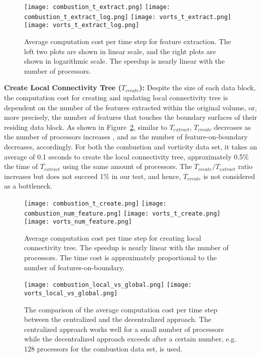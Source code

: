 \begin{figure}[t]
\centering
\texttt{[image: combustion\_t\_extract.png]}
\texttt{[image: combustion\_t\_extract\_log.png]}
\texttt{[image: vorts\_t\_extract.png]}
\texttt{[image: vorts\_t\_extract\_log.png]}
\caption{Average computation cost per time step for feature extraction. The left two plots are shown in linear scale, and the right plots are shown in logarithmic scale. The speedup is nearly linear with the number of processors.}
\label{fig:feature-extraction}
\end{figure}

\textbf{Create Local Connectivity Tree ($T_{create}$): }
Despite the size of each data block, the computation cost for creating and updating local connectivity tree is dependent on the number of the features extracted within the original volume, or, more precisely, the number of features that touches the boundary surfaces of their residing data block. As shown in Figure~\ref{fig:create-local-graph}, similar to $T_{extract}$, $T_{create}$ decreases as the number of processors increases %
, and as the number of feature-on-boundary decreases, accordingly. For both the combustion and vorticity data set, it takes an average of 0.1 seconds to create the local connectivity tree, approximately 0.5\% the time of $T_{extract}$ using the same amount of processors. The $T_{create}/T_{extract}$ ratio increases but does not succeed 1\% in our test, and hence, $T_{create}$ is not considered as a bottleneck. %

\begin{figure}[t]
\centering
\texttt{[image: combustion\_t\_create.png]}
\texttt{[image: combustion\_num\_feature.png]}
\texttt{[image: vorts\_t\_create.png]}
\texttt{[image: vorts\_num\_feature.png]}
\caption{Average computation cost per time step for creating local connectivity tree. The speedup is nearly linear with the number of processors. The time cost is approximately proportional to the number of features-on-boundary.}
\label{fig:create-local-graph}
\end{figure}

\begin{figure}[ht]
\centering
\texttt{[image: combustion\_local\_vs\_global.png]}
\texttt{[image: vorts\_local\_vs\_global.png]}
\caption{The comparison of the average computation cost per time step between the centralized and the decentralized approach. The centralized approach works well for a small number of processors while the decentralized approach exceeds after a certain number, e.g. 128 processors for the combustion data set, is used.}
\label{fig:local-vs-global}
\end{figure}

